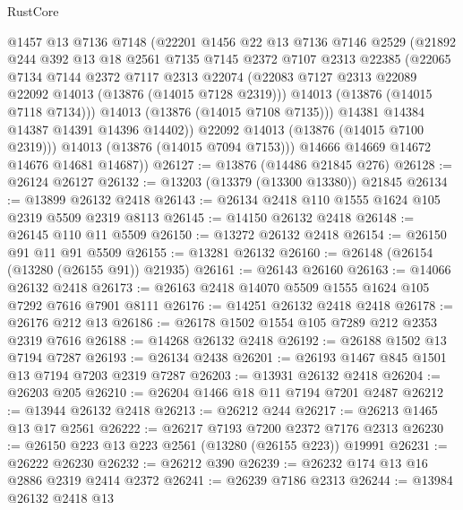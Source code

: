 \begin{lexlean}{RustCore}
\begin{coremodule}
              @1457
              @13
              @7136
              @7148
              (@22201
                @1456
                @22
                @13
                @7136
                @7146
                @2529
                (@21892
                  @244
                  @392
                  @13
                  @18
                  @2561
                  @7135
                  @7145
                  @2372
                  @7107
                  @2313
                  @22385
                  (@22065
                    @7134
                    @7144
                    @2372
                    @7117
                    @2313
                    @22074
                    (@22083 @7127 @2313 @22089 @22092 @14013 (@13876 (@14015 @7128 @2319)))
                    @14013
                    (@13876 (@14015 @7118 @7134)))
                  @14013
                  (@13876 (@14015 @7108 @7135)))
                @14381
                @14384
                @14387
                @14391
                @14396
                @14402))
            @22092
            @14013
            (@13876 (@14015 @7100 @2319)))
          @14013
          (@13876 (@14015 @7094 @7153)))
        @14666
        @14669
        @14672
        @14676
        @14681
        @14687))
@26127 := @13876 (@14486 @21845 @276)
@26128 := @26124 @26127
@26132 := @13203 (@13379 (@13300 @13380)) @21845
@26134 := @13899 @26132 @2418
@26143 := @26134 @2418 @110 @1555 @1624 @105 @2319 @5509 @2319 @8113
@26145 := @14150 @26132 @2418
@26148 := @26145 @110 @11 @5509
@26150 := @13272 @26132 @2418
@26154 := @26150 @91 @11 @91 @5509
@26155 := @13281 @26132
@26160 := @26148 (@26154 (@13280 (@26155 @91)) @21935)
@26161 := @26143 @26160
@26163 := @14066 @26132 @2418
@26173 := @26163 @2418 @14070 @5509 @1555 @1624 @105 @7292 @7616 @7901 @8111
@26176 := @14251 @26132 @2418 @2418
@26178 := @26176 @212 @13
@26186 := @26178 @1502 @1554 @105 @7289 @212 @2353 @2319 @7616
@26188 := @14268 @26132 @2418
@26192 := @26188 @1502 @13 @7194 @7287
@26193 := @26134 @2438
@26201 := @26193 @1467 @845 @1501 @13 @7194 @7203 @2319 @7287
@26203 := @13931 @26132 @2418
@26204 := @26203 @205
@26210 := @26204 @1466 @18 @11 @7194 @7201 @2487
@26212 := @13944 @26132 @2418
@26213 := @26212 @244
@26217 := @26213 @1465 @13 @17 @2561
@26222 := @26217 @7193 @7200 @2372 @7176 @2313
@26230 := @26150 @223 @13 @223 @2561 (@13280 (@26155 @223)) @19991
@26231 := @26222 @26230
@26232 := @26212 @390
@26239 := @26232 @174 @13 @16 @2886 @2319 @2414 @2372
@26241 := @26239 @7186 @2313
@26244 := @13984 @26132 @2418 @13

\end{coremodule}
\end{lexlean}
